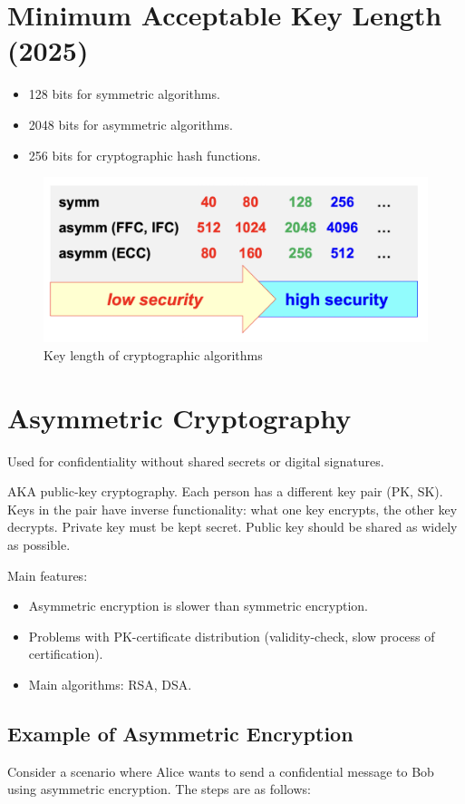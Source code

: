 \section{Minimum Acceptable Key Length (2025)}
\begin{itemize}
    \item 128 bits for symmetric algorithms.
    \item 2048 bits for asymmetric algorithms.
    \item 256 bits for cryptographic hash functions.
\end{itemize}
\begin{figure}[H]
    \centering
    \includegraphics[width=0.5\linewidth]{Images/Cryptography/crypto_key_lens.png}
    \caption{Key length of cryptographic algorithms}
\end{figure}

\section{Asymmetric Cryptography}
\begin{center}
    Used for confidentiality without shared secrets or digital signatures.
\end{center}
AKA public-key cryptography.
Each person has a different key pair (PK, SK). Keys in the pair have inverse functionality: what one key encrypts, the other key decrypts. Private key must be kept secret. Public key should be shared as widely as possible.

\noindent Main features:
\begin{itemize}
    \item Asymmetric encryption is slower than symmetric encryption.
    \item Problems with PK-certificate distribution (validity-check, slow process of certification).
    \item Main algorithms: RSA, DSA.
\end{itemize}


\subsection*{Example of Asymmetric Encryption}
Consider a scenario where Alice wants to send a confidential message to Bob using asymmetric encryption. The steps are as follows:


